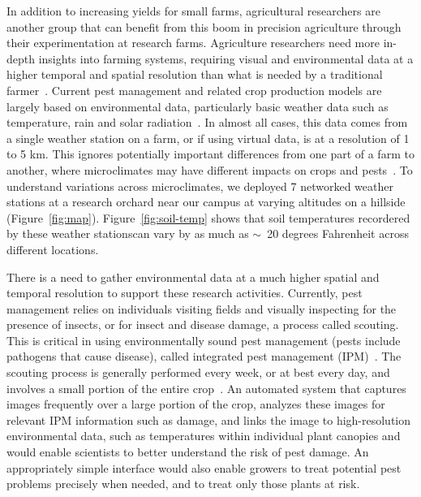 In addition to increasing yields for small farms, agricultural researchers are another group that can benefit from this boom in precision agriculture through their experimentation at research farms. Agriculture researchers need more in-depth insights into farming systems, requiring visual and environmental data at a higher temporal and spatial resolution than what is needed by a traditional farmer~\cite{yield-prediction, crop-estimation, microclimate-specifics}. Current pest management and related crop production models are largely based on environmental data, particularly basic weather data such as temperature, rain and solar radiation~\cite{newa-model}. In almost all cases, this data comes from a single weather station on a farm, or if using virtual data, is at a resolution of 1 to 5 km. This ignores potentially important differences from one part of a farm to another, where microclimates may have different impacts on crops and pests~\cite{microcolimate-effect, microclimates, microclimate-specifics, microclimate-wsn}. To understand variations across microclimates, we deployed 7 networked weather stations at a research orchard near our campus at varying altitudes on a hillside (Figure~\ref{fig:map}). Figure~\ref{fig:soil-temp} shows that soil temperatures recordered by these weather stationscan vary by as much as $\sim$~20 degrees Fahrenheit across different locations. 

There is a need to gather environmental data at a much higher spatial and temporal resolution to support these research activities. Currently, pest management relies on individuals visiting fields and visually inspecting for the presence of insects, or for insect and disease damage, a process called scouting. This is critical in using environmentally sound pest management (pests include pathogens that cause disease), called integrated pest management (IPM)~\cite{ipm-greenhouse, ipm-overview}. The scouting process is generally performed every week, or at best every day, and involves a small portion of the entire crop~\cite{ipm-scouting}. An automated system that captures images frequently over a large portion of the crop, analyzes these images for relevant IPM information such as damage, and links the image to high-resolution environmental data, such as temperatures within individual plant canopies and would enable scientists to better understand the risk of pest damage. An appropriately simple interface would also enable growers to treat potential pest problems precisely when needed, and to treat only those plants at risk.

